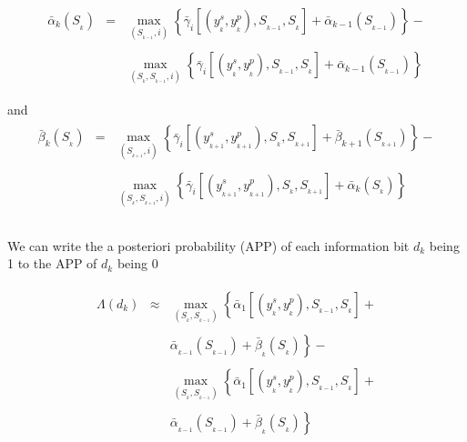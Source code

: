 \begin{eqnarray}
\begin{array}{lll}
\bar{\alpha}_k(S_{_{k}})&=&\max\limits_{\left(S_{_{k-1}},i\right)} \left\{\bar{\gamma}_i\left[\left(y_{_k}^s,y_{_k}^p\right),S_{_{k-1}},S_{_{k}}\right]+\bar{\alpha}_{k-1}(S_{_{k-1}})\right\}-\\ \\
&&\max\limits_{\left(S_{_{k}},S_{_{k-1}},i\right)} \left\{\bar{\gamma}_i\left[\left(y_{_k}^s,y_{_k}^p\right),S_{_{k-1}},S_{_{k}}\right]+\bar{\alpha}_{k-1}(S_{_{k-1}})\right\}\\ \\
\end{array}
\end{eqnarray}
and
\begin{eqnarray}
\begin{array}{lll}
\bar{\beta}_k(S_{_{k}})&=&\max\limits_{\left(S_{_{k+1}},i\right)} \left\{\bar{\gamma}_i\left[\left(y_{_{k+1}}^s,y_{_{k+1}}^p\right),S_{_{k}},S_{_{k+1}}\right]+\bar{\beta}_{k+1}(S_{_{k+1}})\right\}-\\ \\
&&\max\limits_{\left(S_{_{k}},S_{_{k+1}},i\right)} \left\{\bar{\gamma}_i\left[\left(y_{_{k+1}}^s,y_{_{k+1}}^p\right),S_{_{k}},S_{_{k+1}}\right]+\bar{\alpha}_{k}(S_{_{k}})\right\}\\ \\
\end{array}
\end{eqnarray}

We can write the a posteriori probability (APP) of each information bit $d_k$ being 1 to the APP of $d_k$ being 0

\begin{eqnarray}
\begin{array}{lll}
\Lambda(d_k)&\approx&\max\limits_{\left(S_{_{k}},S_{_{k-1}}\right)} \left\{\bar{\alpha}_1\left[\left(y_{_{k}}^s,y_{_{k}}^p\right),S_{_{k-1}},S_{_{k}}\right]\right .+ \\ \\
&&\left.\bar{\alpha}_{_{k-1}}\left(S_{_{k-1}}\right)+\bar{\beta}_{_k}\left(S_{_{k}}\right)\right \}- \\ \\
&&\max\limits_{\left(S_{_{k}},S_{_{k-1}}\right)} \left\{\bar{\alpha}_1\left[\left(y_{_{k}}^s,y_{_{k}}^p\right),S_{_{k-1}},S_{_{k}}\right]\right .+ \\ \\
&&\left. \bar{\alpha}_{_{k-1}}\left(S_{_{k-1}}\right)+\bar{\beta}_{_k}\left(S_{_{k}}\right)\right \}
\end{array}
\end{eqnarray}

